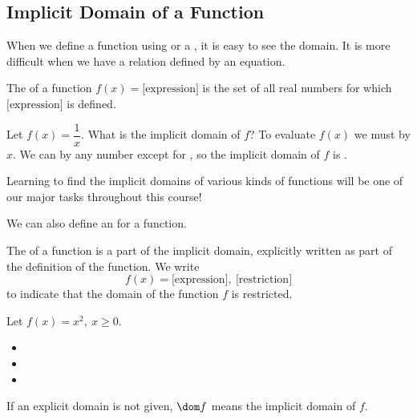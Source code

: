 \subsection{Implicit Domain of a Function} 
When we define a function using \makeblank[1.5in] or a \makeblank[1.5in], it is easy to see the domain. It is more difficult when we have a relation defined by an equation.
\begin{definition}
The  of a function $f(x)=\mbox{[expression]}$ is the set of all real numbers for which $\mbox{[expression]}$ is defined.
\end{definition}
\begin{Example}
Let $f(x)=\dfrac{1}{x}$. What is the implicit domain of $f$?\lbr
To evaluate $f(x)$ we must \makeblank[1in] by $x$. We can \makeblank[1in] by any number except for \makeblanksmall, so the implicit domain of $f$ is \makeblank.
\end{Example}
\begin{Note}Learning to find the implicit domains of various kinds of functions will be one of our major tasks throughout this course!\end{Note}
We can also define an  for a function.
\begin{definition}
The  of a function is a part of the implicit domain, explicitly written as part of the definition of the function. We write
$$f(x)=\mbox{[expression]},\ \mbox{[restriction]}$$
to indicate that the domain of the function $f$ is restricted.
\end{definition}
\begin{Example}
Let $f(x)=x^2,\ x\geq 0$.
\begin{itemize}
\item {}
\item {}
\item {}
\end{itemize}
\end{Example}
If an explicit domain is not given, $\dom f$ means the implicit domain of $f$.